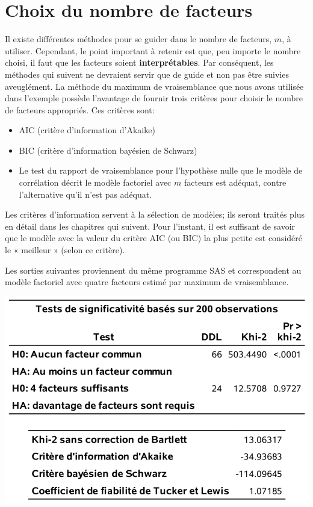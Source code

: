 \documentclass[
]{book}
\providecommand{\tightlist}{%
  \setlength{\itemsep}{0pt}\setlength{\parskip}{0pt}}
\theoremstyle{definition}
\theoremstyle{definition}
\theoremstyle{definition}
\theoremstyle{remark}
\begin{document}
\hypertarget{choix-du-nombre-de-facteurs}{%
\section{Choix du nombre de facteurs}\label{choix-du-nombre-de-facteurs}}

Il existe différentes méthodes pour se guider dans le nombre de facteurs, \(m\), à utiliser. Cependant, le point important à retenir est que, peu importe le nombre choisi, il faut que les facteurs soient \textbf{interprétables}. Par conséquent, les méthodes qui
suivent ne devraient servir que de guide et non pas être suivies aveuglément.
La méthode du maximum de vraisemblance que nous avons utilisée dans l'exemple possède l'avantage de fournir trois critères pour choisir le nombre de facteurs appropriés. Ces critères sont:

\begin{itemize}
\tightlist
\item
  AIC (critère d'information d'Akaike)
\item
  BIC (critère d'information bayésien de Schwarz)
\item
  Le test du rapport de vraisemblance pour l'hypothèse nulle que le modèle de corrélation décrit le modèle factoriel avec \(m\) facteurs est adéquat, contre l'alternative qu'il n'est pas adéquat.
\end{itemize}

Les critères d'information servent à la sélection de modèles; ils seront traités plus en détail dans les chapitres qui suivent. Pour l'instant, il est suffisant de savoir que le modèle avec la valeur du critère AIC (ou BIC) la plus petite est considéré le « meilleur » (selon ce critère).

Les sorties suivantes proviennent du même programme SAS et correspondent au modèle factoriel avec quatre facteurs estimé par maximum de vraisemblance.

\begin{center}\includegraphics[width=0.7\linewidth]{figures/01-facto-e4} \end{center}
\end{document}
